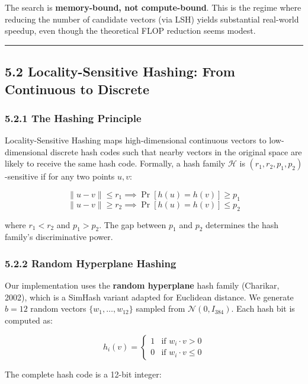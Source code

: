 The search is \textbf{memory-bound, not compute-bound}. This is the regime where reducing the number of candidate vectors (via LSH) yields substantial real-world speedup, even though the theoretical FLOP reduction seems modest.

\begin{center}\rule{0.5\linewidth}{0.5pt}\end{center}

\subsection{5.2 Locality-Sensitive Hashing: From Continuous to Discrete}\label{locality-sensitive-hashing-from-continuous-to-discrete}

\subsubsection{5.2.1 The Hashing Principle}\label{the-hashing-principle}

Locality-Sensitive Hashing maps high-dimensional continuous vectors to low-dimensional discrete hash codes such that nearby vectors in the original space are likely to receive the same hash code. Formally, a hash family \(\mathcal{H}\) is \((r_1, r_2, p_1, p_2)\)-sensitive if for any two points \(u, v\):

\[\|u - v\| \leq r_1 \implies \Pr[h(u) = h(v)] \geq p_1\] \[\|u - v\| \geq r_2 \implies \Pr[h(u) = h(v)] \leq p_2\]

where \(r_1 < r_2\) and \(p_1 > p_2\). The gap between \(p_1\) and \(p_2\) determines the hash family's discriminative power.

\subsubsection{5.2.2 Random Hyperplane Hashing}\label{random-hyperplane-hashing}

Our implementation uses the \textbf{random hyperplane} hash family (Charikar, 2002), which is a SimHash variant adapted for Euclidean distance. We generate \(b = 12\) random vectors \(\{w_1, \ldots, w_{12}\}\) sampled from \(\mathcal{N}(0, I_{384})\). Each hash bit is computed as:

\[h_i(v) = \begin{cases} 1 & \text{if } w_i \cdot v > 0 \\ 0 & \text{if } w_i \cdot v \leq 0 \end{cases}\]

The complete hash code is a 12-bit integer:


